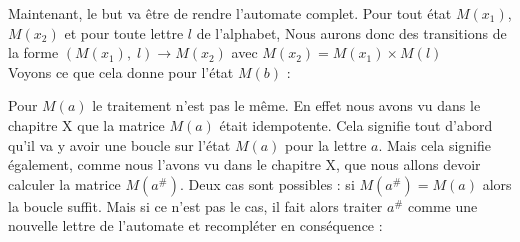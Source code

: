 \documentclass{report}
\begin{document}
Maintenant, le but va être de rendre l'automate complet. Pour tout état $M(x_{1})$, $M(x_{2})$ et pour toute lettre $l$ de l'alphabet, Nous aurons donc des transitions de la forme $(M(x_{1}),\; l) \rightarrow M(x_{2})$  avec $M(x_{2}) = M(x_{1}) \times M(l)$\\
Voyons ce que cela donne pour l'état $M(b)$ :

\begin{center}
\end{center}
$\ $\\
 
Pour $M(a)$ le traitement n'est pas le même. En effet nous avons vu dans le chapitre X que la matrice $M(a)$ était idempotente. Cela signifie tout d'abord qu'il va y avoir une boucle sur l'état $M(a)$ pour la lettre $a$. Mais cela signifie également, comme nous l'avons vu dans le chapitre X, que nous allons devoir calculer la matrice $M(a^{\#})$. Deux cas sont possibles : si $M(a^{\#}) = M(a)$ alors la boucle suffit. Mais si ce n'est pas le cas, il fait alors traiter $a^{\#}$ comme une nouvelle lettre de l'automate et recompléter en conséquence : 

\begin{center}
\end{center}
$\ $\\
\end{document}
